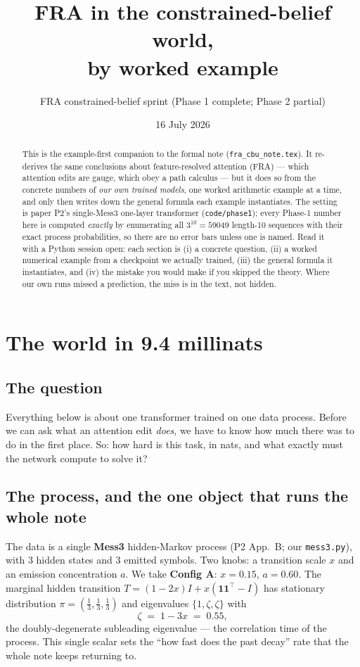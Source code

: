 \documentclass[11pt]{article}
\title{FRA in the constrained-belief world,\\ by worked example}
\author{FRA constrained-belief sprint (Phase 1 complete; Phase 2 partial)}
\date{16 July 2026}
\newcommand{\pzeta}{\zeta}
\begin{document}
\maketitle

\begin{abstract}
This is the example-first companion to the formal note
(\texttt{fra\_cbu\_note.tex}). It re-derives the same conclusions about
feature-resolved attention (FRA) --- which attention edits are gauge, which
obey a path calculus --- but it does so from the concrete numbers of
\emph{our own trained models}, one worked arithmetic example at a time, and
only then writes down the general formula each example instantiates. The
setting is paper P2's single-Mess3 one-layer transformer
(\texttt{code/phase1}); every Phase-1 number here is computed \emph{exactly}
by enumerating all $3^{10}=59049$ length-10 sequences with their exact
process probabilities, so there are no error bars unless one is named. Read
it with a Python session open: each section is (i) a concrete question, (ii)
a worked numerical example from a checkpoint we actually trained, (iii) the
general formula it instantiates, and (iv) the mistake you would make if you
skipped the theory. Where our own runs missed a prediction, the miss is in
the text, not hidden.
\end{abstract}

\tableofcontents

\section{The world in 9.4 millinats}\label{sec:world}

\subsection{The question}

Everything below is about one transformer trained on one data process. Before
we can ask what an attention edit \emph{does}, we have to know how much there
was to do in the first place. So: how hard is this task, in nats, and what
exactly must the network compute to solve it?

\subsection{The process, and the one object that runs the whole note}

The data is a single \textbf{Mess3} hidden-Markov process (P2 App.~B; our
\texttt{mess3.py}), with $3$ hidden states and $3$ emitted symbols. Two knobs:
a transition scale $x$ and an emission concentration $a$. We take
\textbf{Config A}: $x=0.15$, $a=0.60$. The marginal hidden transition
$T=(1-2x)I + x(\mathbf 1\mathbf1^\top - I)$ has stationary distribution
$\pi=(\tfrac13,\tfrac13,\tfrac13)$ and eigenvalues $\{1,\pzeta,\pzeta\}$ with
\[
  \pzeta \;=\; 1-3x \;=\; 0.55 ,
\]
the doubly-degenerate subleading eigenvalue --- the correlation time of the
process. This single scalar sets the ``how fast does the past decay'' rate
that the whole note keeps returning to.
\end{document}
